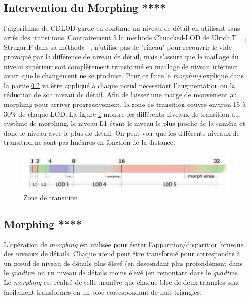 \subsection{Intervention du Morphing ****}
\label{subsec:interventionMorphing}
    l'algorithme de CDLOD garde en continue un niveau de détail en utilisant sans arrêt des transitions. Contrairement à la méthode Chuncked-LOD de Ulrich.T ~\cite{CLOD} , Strugar.F dans sa méthode ~\cite{CDLOD}, n'utilise pas de "rideau" pour recouvrir le vide provoqué par la différence de niveau de détail, mais s'assure que le maillage du niveau supérieur soit complètement transformé en maillage de niveau inférieur avant que le changement ne se produise. Pour ce faire le \emph{morphing} expliqué dans la partie \ref{subsec:morphing} va être appliqué à chaque n\oe{}ud nécessitant l'augmentation ou la réduction de son niveau de détail. Afin de laisser une marge de mouvement au morphing pour arriver progressivement, la zone de transition couvre environ 15 à 30\% de chaque LOD. La figure \ref{fig:morph-area} montre les différents niveaux de transition du système de morphing, le niveau L1 étant le niveau le plus proche de la caméra et donc le niveau avec le plus de détail. On peut voir que les différents niveaux de transition ne sont pas linéaires en fonction de la distance.
\begin{figure}[!ht]
    \includegraphics[width=12cm]{img/morph-area.png}
    \caption[morph-area]{Zone de transition \protect\footnotemark}
    \label{fig:morph-area}
\end{figure}

\subsection{Morphing ****}
\label{subsec:morphing}

  L'opération de \emph{morphing} est utilisée pour éviter l'apparition/disparition brusque des niveaux de détails. Chaque n\oe{}ud peut être transformé pour correspondre à un n\oe{}ud de niveau de détails plus élevé (en descendant plus profondément dans le \emph{quadtree} ou un niveau de détails moins élevé (en remontant dans le \emph{quadtree}. Le \emph{morphing} est réalisé de telle manière que chaque bloc de deux triangles sont  facilement transformés en un bloc correspondant de huit triangles. 
  
